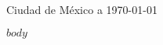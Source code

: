 \documentclass{article}
\begin{document}
  

\begin{flushright} 
Ciudad de México a \today
\end{flushright}

$body$
\end{document}
